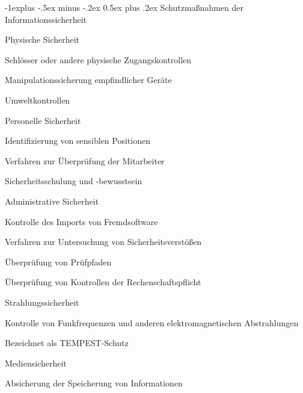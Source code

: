 \documentclass[a4paper]{article}
\makeatletter
\renewcommand{\subsection}{\@startsection{subsection}{2}{0mm}%
 {-1explus -.5ex minus -.2ex}%
 {0.5ex plus .2ex}%
 {\normalfont\normalsize\bfseries}}
\makeatother
\begin{document}
\begin{multicols}{3}
      \subsection{Schutzmaßnahmen der Informationssicherheit}
      \begin{itemize*}
            \item Physische Sicherheit
            \begin{itemize*}
                  \item Schlösser oder andere physische Zugangskontrollen
                  \item Manipulationssicherung empfindlicher Geräte
                  \item Umweltkontrollen
            \end{itemize*}
            \item Personelle Sicherheit
            \begin{itemize*}
                  \item Identifizierung von sensiblen Positionen
                  \item Verfahren zur Überprüfung der Mitarbeiter
                  \item Sicherheitsschulung und -bewusstsein
            \end{itemize*}
            \item Administrative Sicherheit
            \begin{itemize*}
                  \item Kontrolle des Imports von Fremdsoftware
                  \item Verfahren zur Untersuchung von Sicherheitsverstößen
                  \item Überprüfung von Prüfpfaden
                  \item Überprüfung von Kontrollen der Rechenschaftspflicht
            \end{itemize*}
            \item Strahlungssicherheit
            \begin{itemize*}
                  \item Kontrolle von Funkfrequenzen und anderen elektromagnetischen Abstrahlungen
                  \item Bezeichnet als TEMPEST-Schutz
            \end{itemize*}
            \item Mediensicherheit
            \begin{itemize*}
                  \item Absicherung der Speicherung von Informationen

\end{itemize*}
\end{itemize*}
\end{multicols}
\end{document}
